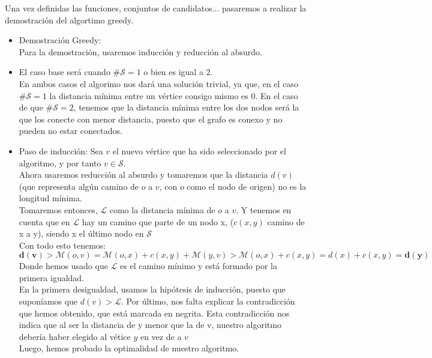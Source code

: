 \documentclass[11pt,openany]{book}
\begin{document}
Una vez definidas las funciones, conjuntos de candidatos... pasaremos a realizar la demostración del algortimo greedy.

\begin{itemize}
      \item Demostración Greedy: \\
            Para la demostración, usaremos inducción y reducción al absurdo.
      \item El caso base será cuando \#$\mathscr{S}=1$ o bien es igual a 2.\\
            En ambos casos el algorimo nos dará una solución trivial, ya que, en el caso \#$\mathscr{S}=1$ la distancia mínima entre un vértice consigo mismo es 0.
            En el caso de que \#$\mathscr{S}=2$, tenemos que la distancia mínima entre los dos nodos será la que los conecte con menor distancia, puesto que el grafo es conexo y no pueden no estar conectados.
      \item Paso de inducción:
            Sea $v$ el nuevo vértice que ha sido seleccionado por el algoritmo, y por tanto $v\in \mathscr{S}$.\\
            Ahora usaremos reducción al absurdo y tomaremos que la distancia $d(v)$ (que representa algún camino de $o$ a $v$, con $o$ como el nodo de origen) no es la longitud mínima.\\
            Tomaremos entonces, $\mathscr{L}$ como la distancia mínima de $o$ a $v$. Y tenemos en cuenta que en $\mathscr{L}$ hay un camino que parte de un nodo x, ($c(x,y)$ camino de x a y), siendo x el último nodo en $\mathscr{S}$\\
            Con todo esto tenemos:
            \begin{equation*}
                  \mathbf{d(v)}\bm{>}\mathscr{M}(o,v)=\mathscr{M}(o,x)+c(x,y)+\mathscr{M}(y,v) > \mathscr{M}(o,x)+c(x,y)= d(x)+c(x,y)=\mathbf{d(y)}
            \end{equation*}
            Donde hemos usado que $\mathscr{L}$ es el camino mínimo y está formado por la primera igualdad.\\
            En la primera desigualdad, usamos la hipótesis de inducción, puesto que suponíamos que $d(v)>\mathscr{L}$.
            Por último, nos falta explicar la contradicción que hemos obtenido, que está marcada en negrita.
            Esta contradicción nos indica que al ser la distancia de y menor que la de v, nuestro algoritmo debería haber elegido al vétice $y$ en vez de a $v$\\
            Luego, hemos probado la optimalidad de nuestro algoritmo.

\end{itemize}
\end{document}
